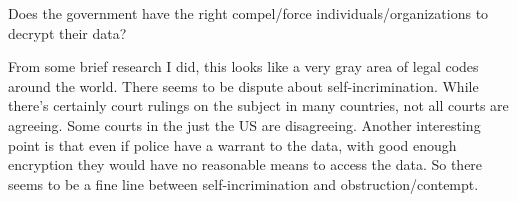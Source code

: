 \documentclass[a4paper,10pt]{article}
\begin{document}
Does the government have the right compel/force individuals/organizations to decrypt their data? 

From some brief research I did, this looks like a very gray area of legal codes around the world. There seems to be dispute about self-incrimination. While there's certainly court rulings on the subject in many countries, not all courts are agreeing. Some courts in the just the US are disagreeing. Another interesting point is that even if police have a warrant to the data, with good enough encryption they would have no reasonable means to access the data. So there seems to be a fine line between self-incrimination and obstruction/contempt.
\end{document}

